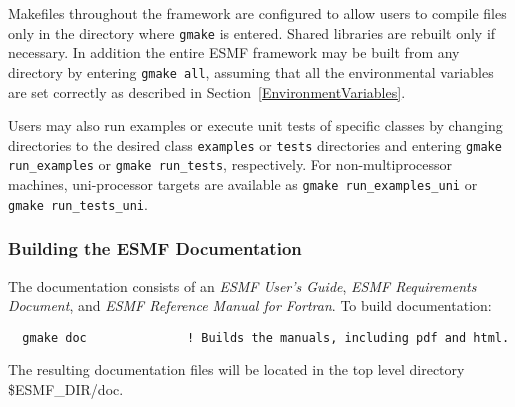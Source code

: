 Makefiles throughout the framework are configured to allow users to
compile files only in the directory where {\tt gmake} is entered. Shared
libraries are rebuilt only if necessary. In addition the entire ESMF
framework may be built from any directory by entering {\tt gmake all},
assuming that all the environmental variables are set correctly as
described in Section~\ref{EnvironmentVariables}.

Users may also run examples or execute unit tests of specific classes
by changing directories to the desired class {\tt examples} or {\tt tests} 
directories and entering {\tt gmake run\_examples} or 
{\tt gmake run\_tests}, respectively.  For non-multiprocessor machines,
uni-processor targets are available as {\tt gmake run\_examples\_uni} or
{\tt gmake run\_tests\_uni}.

\subsubsection{Building the ESMF Documentation}
\label{BuildDocumentation}

The documentation consists of an {\it ESMF User's Guide}, {\it ESMF Requirements 
Document}, and {\it ESMF Reference Manual for Fortran}.  
\noindent To build documentation:
\begin{verbatim}
  gmake doc              ! Builds the manuals, including pdf and html.
\end{verbatim}

\noindent The resulting documentation files will be
located in the top level directory \${ESMF\_DIR}/doc.



